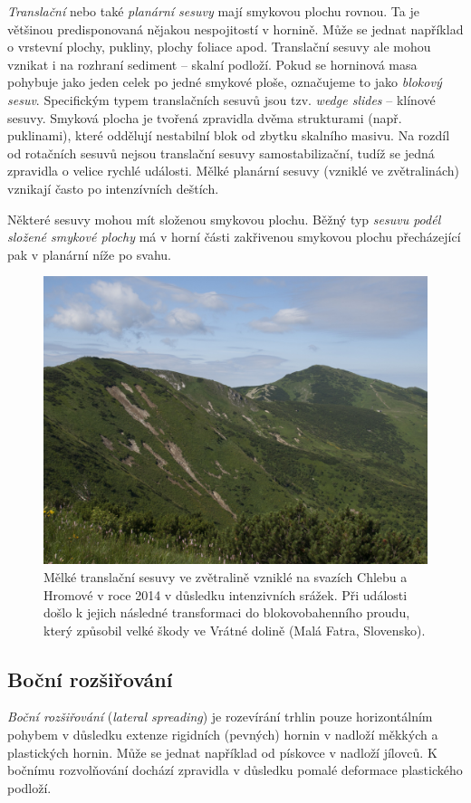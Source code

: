 \emph{Translační} nebo také \emph{planární sesuvy} mají smykovou plochu rovnou. Ta je většinou predisponovaná nějakou nespojitostí v hornině. Může se jednat například o vrstevní plochy, pukliny, plochy foliace apod. Translační sesuvy ale mohou vznikat i na rozhraní sediment -- skalní podloží. Pokud se horninová masa pohybuje jako jeden celek po jedné smykové ploše, označujeme to jako \emph{blokový sesuv}. Specifickým typem translačních sesuvů jsou tzv. \textit{wedge slides} -- klínové sesuvy. Smyková plocha je tvořená zpravidla dvěma strukturami (např. puklinami), které oddělují nestabilní blok od zbytku skalního masivu. Na rozdíl od rotačních sesuvů nejsou translační sesuvy samostabilizační, tudíž se jedná zpravidla o velice rychlé události. Mělké planární sesuvy (vzniklé ve zvětralinách) vznikají často po intenzívních deštích. 

Některé sesuvy mohou mít složenou smykovou plochu. Běžný typ \emph{sesuvu podél složené smykové plochy} má v horní části zakřivenou smykovou plochu přecházející pak v planární níže po svahu.
\begin{figure}
	\centering
	\includegraphics[width=1\linewidth]{obrazky/slope/melke}
	\caption{Mělké translační sesuvy ve zvětralině vzniklé na svazích Chlebu a Hromové v roce 2014 v důsledku intenzivních srážek. Při události došlo k jejich následné transformaci do blokovobahenního proudu, který způsobil velké škody ve Vrátné dolině (Malá Fatra, Slovensko).}
	\label{fig:melke}
\end{figure}

\subsection{Boční rozšiřování}
\emph{Boční rozšiřování} (\textit{lateral spreading}) je rozevírání trhlin pouze horizontálním pohybem v důsledku extenze rigidních (pevných) hornin v nadloží měkkých a plastických hornin. Může se jednat například od pískovce v nadloží jílovců. K bočnímu rozvolňování dochází zpravidla v důsledku pomalé deformace plastického podloží. 

